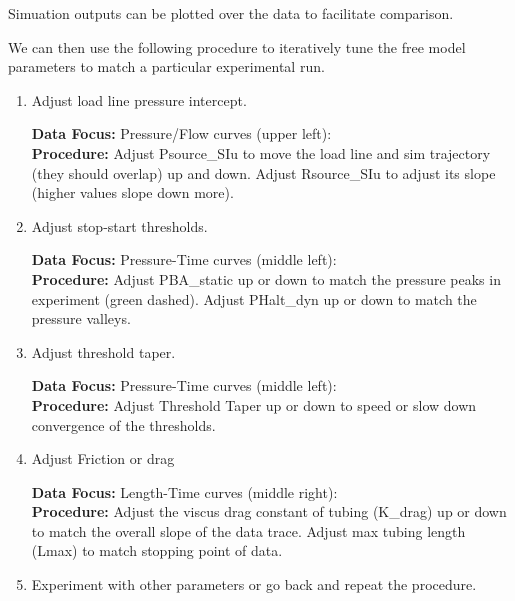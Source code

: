 \documentclass[letterpaper]{article}
\begin{document}

Simuation outputs can be plotted over the data to facilitate comparison.

We can then use the following procedure to iteratively tune  the free model  parameters to match a
particular experimental run.

\begin{enumerate}
    \item  Adjust load line pressure intercept.

    {\bf Data Focus: } Pressure/Flow curves (upper left):\\
    {\bf Procedure: } Adjust Psource\_SIu to move the load line and sim trajectory (they should overlap)
    up and down.  Adjust Rsource\_SIu to adjust its slope (higher values slope down more).

    \item Adjust stop-start thresholds.

     {\bf Data Focus: } Pressure-Time curves (middle left):\\
    {\bf Procedure: } Adjust PBA\_static up or down to match the pressure peaks in experiment (green dashed).
    Adjust PHalt\_dyn  up or down to match the pressure valleys.

    \item Adjust threshold taper.

     {\bf Data Focus: } Pressure-Time curves (middle left):\\
    {\bf Procedure: } Adjust Threshold Taper up or down to speed or slow down convergence of the thresholds.

    \item Adjust Friction or drag

     {\bf Data Focus: } Length-Time curves (middle right):\\
    {\bf Procedure: } Adjust the viscus drag constant of tubing (K\_drag) up or down to match the overall slope
    of the data trace.
    Adjust max tubing length (Lmax) to match stopping point of data.

    \item Experiment with other parameters or go back and repeat the procedure.

\end{enumerate}
\end{document}
